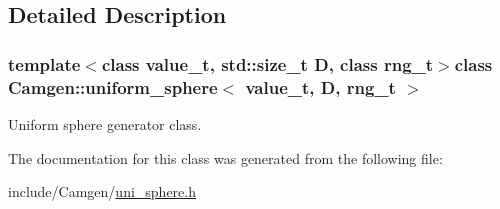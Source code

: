 \subsection{Detailed Description}
\subsubsection*{template$<$class value\-\_\-t, std\-::size\-\_\-t D, class rng\-\_\-t$>$class Camgen\-::uniform\-\_\-sphere$<$ value\-\_\-t, D, rng\-\_\-t $>$}

Uniform sphere generator class. 

The documentation for this class was generated from the following file\-:\begin{DoxyCompactItemize}
\item 
include/\-Camgen/\hyperlink{a00797}{uni\-\_\-sphere.\-h}\end{DoxyCompactItemize}
